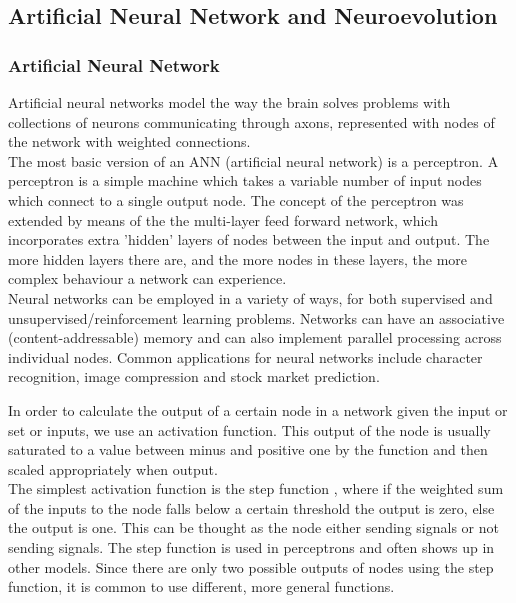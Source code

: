 \documentclass[12pt,a4paper]{article}
\begin{document}
\newpage
\subsection{Artificial Neural Network and Neuroevolution}
\subsubsection{Artificial Neural Network}

Artificial neural networks model the way the brain solves problems with collections of neurons communicating through axons, represented with nodes of the network with weighted connections. \\

The most basic version of an ANN (artificial neural network) is a perceptron. A perceptron is a simple machine which takes a variable number of input nodes which connect to a single output node. \cite{percept} The concept of the perceptron was extended by means of the the multi-layer feed forward network, which incorporates extra 'hidden' layers of nodes between the input and output. The more hidden layers there are, and the more nodes in these layers, the more complex behaviour a network can experience. \cite{ffann}\\

Neural networks can be employed in a variety of ways, for both supervised and unsupervised/reinforcement learning problems. Networks can have an associative (content-addressable) memory and can also implement parallel processing across individual nodes. \cite{nnm} Common applications for neural networks include character recognition, image compression and stock market prediction. \cite{nnapps}
\begin{figure}[h]
\end{figure}
\newpage
In order to calculate the output of a certain node in a network given the input or set or inputs, we use an activation function. \cite{activate} This output of the node is usually saturated to a value between minus and positive one by the function and then scaled appropriately when output. \cite{swarmann} \\

The simplest activation function is the step function \cite{nnm}, where if the weighted sum of the inputs to the node falls below a certain threshold the output is zero, else the output is one. This can be thought as the node either sending signals or not sending signals. The step function is used in perceptrons and often shows up in other models. \cite{percept} Since there are only two possible outputs of nodes using the step function, it is common to use different, more general functions.\\
\end{document}
